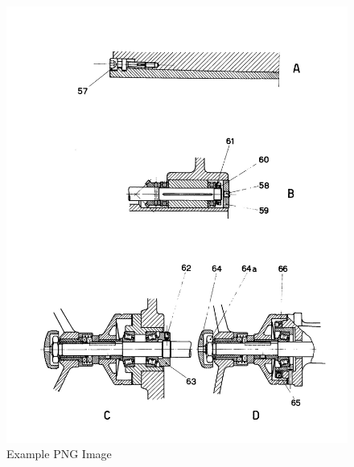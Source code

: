 \newpage
\begin{figure}[h]
    \centering
    \includegraphics[width=1.0\linewidth]{./images/page_27}
    \caption{Example PNG Image}
    \label{fig:handwheel_bearings}
\end{figure}
